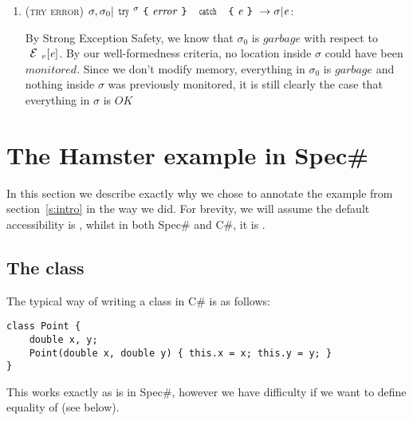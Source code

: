 \begin{enumerate}
\begin{itemize}
\end{itemize}

\item (\textsc{try error}) $\sigma,\sigma_0|\Kw{try}^\sigma\oC \mathit{error}\cC\ \Kw{catch}\ \oC\e\cC\rightarrow \sigma|\e$:

	By Strong Exception Safety, we know that $\sigma_0$ is $\mathit{garbage}$ with respect to $\ctx_v[\e]$. By our well-formedness criteria, no location inside $\sigma$ could have been $monitored$.
	Since we don't modify memory, everything in $\sigma_0$ is $\mathit{garbage}$ and nothing inside $\sigma$ was previously monitored, it is still clearly the case that everything in $\sigma$ is $\mathit{OK}$ 
\end{enumerate}

\section{The Hamster example in Spec\#}
\label{s:justice}

In this section we describe exactly why we chose to annotate the example from section~\ref{s:intro} in the way we did. For brevity, we will assume the default accessibility is \Q@public@, whilst in both Spec\# and C\#, it is \Q@private@.

\subsection{The \Q@Point@ class} 
The typical way of writing a \Q@Point@ class in C\# is as follows:
\begin{lstlisting}
class Point {
	double x, y;
	Point(double x, double y) { this.x = x; this.y = y; }
}
\end{lstlisting}
This works exactly as is in Spec\#, however we have difficulty if we want to define equality of \Q@Point@s (see below).

